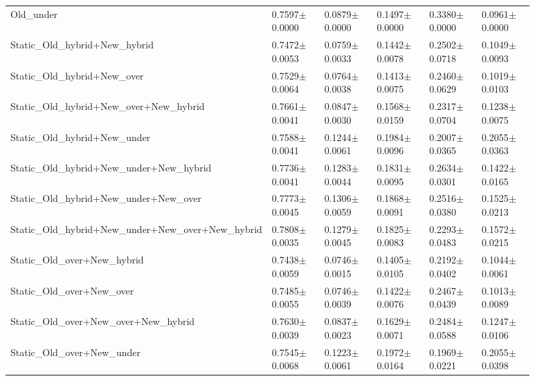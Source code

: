 \begin{longtable}{p{0.28\linewidth}p{0.12\linewidth}p{0.12\linewidth}p{0.12\linewidth}p{0.12\linewidth}p{0.12\linewidth}}
Old\_\allowbreak{}under & 0.7597\(\pm\)0.0000 & 0.0879\(\pm\)0.0000 & 0.1497\(\pm\)0.0000 & 0.3380\(\pm\)0.0000 & 0.0961\(\pm\)0.0000 \\
Static\_\allowbreak{}Old\_\allowbreak{}hybrid+New\_\allowbreak{}hybrid & 0.7472\(\pm\)0.0053 & 0.0759\(\pm\)0.0033 & 0.1442\(\pm\)0.0078 & 0.2502\(\pm\)0.0718 & 0.1049\(\pm\)0.0093 \\
Static\_\allowbreak{}Old\_\allowbreak{}hybrid+New\_\allowbreak{}over & 0.7529\(\pm\)0.0064 & 0.0764\(\pm\)0.0038 & 0.1413\(\pm\)0.0075 & 0.2460\(\pm\)0.0629 & 0.1019\(\pm\)0.0103 \\
Static\_\allowbreak{}Old\_\allowbreak{}hybrid+New\_\allowbreak{}over+New\_\allowbreak{}hybrid & 0.7661\(\pm\)0.0041 & 0.0847\(\pm\)0.0030 & 0.1568\(\pm\)0.0159 & 0.2317\(\pm\)0.0704 & 0.1238\(\pm\)0.0075 \\
Static\_\allowbreak{}Old\_\allowbreak{}hybrid+New\_\allowbreak{}under & 0.7588\(\pm\)0.0041 & 0.1244\(\pm\)0.0061 & 0.1984\(\pm\)0.0096 & 0.2007\(\pm\)0.0365 & 0.2055\(\pm\)0.0363 \\
Static\_\allowbreak{}Old\_\allowbreak{}hybrid+New\_\allowbreak{}under+New\_\allowbreak{}hybrid & 0.7736\(\pm\)0.0041 & 0.1283\(\pm\)0.0044 & 0.1831\(\pm\)0.0095 & 0.2634\(\pm\)0.0301 & 0.1422\(\pm\)0.0165 \\
Static\_\allowbreak{}Old\_\allowbreak{}hybrid+New\_\allowbreak{}under+New\_\allowbreak{}over & 0.7773\(\pm\)0.0045 & 0.1306\(\pm\)0.0059 & 0.1868\(\pm\)0.0091 & 0.2516\(\pm\)0.0380 & 0.1525\(\pm\)0.0213 \\
Static\_\allowbreak{}Old\_\allowbreak{}hybrid+New\_\allowbreak{}under+New\_\allowbreak{}over+New\_\allowbreak{}hybrid & 0.7808\(\pm\)0.0035 & 0.1279\(\pm\)0.0045 & 0.1825\(\pm\)0.0083 & 0.2293\(\pm\)0.0483 & 0.1572\(\pm\)0.0215 \\
Static\_\allowbreak{}Old\_\allowbreak{}over+New\_\allowbreak{}hybrid & 0.7438\(\pm\)0.0059 & 0.0746\(\pm\)0.0015 & 0.1405\(\pm\)0.0105 & 0.2192\(\pm\)0.0402 & 0.1044\(\pm\)0.0061 \\
Static\_\allowbreak{}Old\_\allowbreak{}over+New\_\allowbreak{}over & 0.7485\(\pm\)0.0055 & 0.0746\(\pm\)0.0039 & 0.1422\(\pm\)0.0076 & 0.2467\(\pm\)0.0439 & 0.1013\(\pm\)0.0089 \\
Static\_\allowbreak{}Old\_\allowbreak{}over+New\_\allowbreak{}over+New\_\allowbreak{}hybrid & 0.7630\(\pm\)0.0039 & 0.0837\(\pm\)0.0023 & 0.1629\(\pm\)0.0071 & 0.2484\(\pm\)0.0588 & 0.1247\(\pm\)0.0106 \\
Static\_\allowbreak{}Old\_\allowbreak{}over+New\_\allowbreak{}under & 0.7545\(\pm\)0.0068 & 0.1223\(\pm\)0.0061 & 0.1972\(\pm\)0.0164 & 0.1969\(\pm\)0.0221 & 0.2055\(\pm\)0.0398 \\

\end{longtable}
